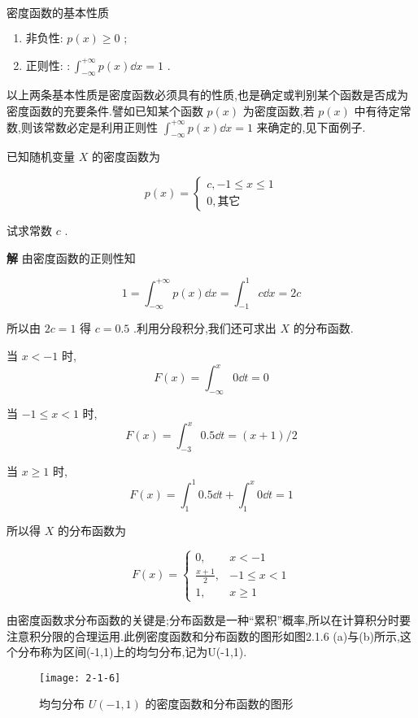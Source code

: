  $ 密度函数的基本性质 $ 
\begin{enumerate}
\item 非负性: $ p(x) \geqslant 0 $ ;
\item 正则性: $ : \int_{-\infty}^{+\infty} p(x) \dd x=1 $ .
\end{enumerate}

以上两条基本性质是密度函数必须具有的性质,也是确定或判别某个函数是否成为密度函数的充要条件.譬如已知某个函数 $ p(x) $ 为密度函数,若 $ p(x) $ 中有待定常数,则该常数必定是利用正则性 $ \int_{-\infty}^{+\infty} p(x) \dd x=1 $ 来确定的,见下面例子.

\begin{example}\label{exam:2.1.7}
	已知随机变量 $ X $ 的密度函数为
	
	\[ 
	p(x)=\left\{\begin{array}{ll}
	{c,-1 \leqslant x \leqslant 1} \\ 
	{0,\text{其它}}
	\end{array}\right.
	\]
	
	试求常数 $ c $ .
	
	\textbf{解} 由密度函数的正则性知
	
	\[ 
	1=\int_{-\infty}^{+\infty} p(x) \dd x=\int_{-1}^{1} c \dd x=2 c
	\]
	
	所以由 $ 2c=1 $ 得 $ c=0.5 $ .利用分段积分,我们还可求出 $ X $ 的分布函数.
	
	当 $ x<-1 $ 时,
	\[ 
	F(x)=\int_{-\infty}^{x} 0 \dd t=0
	\]
	
	当 $ -1 \leqslant x<1 $ 时,
	\[ 
	F(x)=\int_{-3}^{x} 0.5 \dd t=(x+1) / 2
	\]
	
	当 $ x \geqslant 1 $ 时,
	\[ 
	F(x)=\int_{1}^{1} 0.5 \dd t+\int_{1}^{x} 0 \dd t=1
	\]
	
	所以得 $ X $ 的分布函数为
	
	\[ 
	F(x)=\left\{\begin{array}{ll}
	{0,} & {x<-1} \\ 
	{\frac{x+1}{2},} & {-1 \leqslant x<1} \\ 
	{1,} & {x \geqslant 1}
	\end{array}\right.
	\]
	
\end{example}


由密度函数求分布函数的关键是;分布函数是一种“累积”概率,所以在计算积分时要注意积分限的合理运用.此例密度函数和分布函数的图形如图2.1.6
(a)与(b)所示,这个分布称为区间(-1,1)上的均匀分布,记为U(-1,1).

\begin{figure}
	\centering
	\texttt{[image: 2-1-6]}
	\caption{均匀分布 $ U(-1,1) $ 的密度函数和分布函数的图形}
	\label{fig:2.1.6}
\end{figure}

